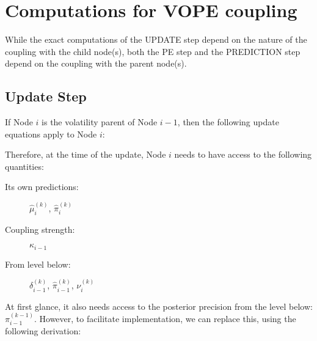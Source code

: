 \section{Computations for VOPE coupling}
While the exact computations of the \textsf{UPDATE step} depend on the nature of the coupling with the child node(s), both the \textsf{PE step} and the \textsf{PREDICTION step} depend on the coupling with the parent node(s).

\subsection{Update Step}
If Node $i$ is the volatility parent of Node $i-1$, then the following update equations apply to Node $i$:
\vspace{0.5cm}

\noindent
{}%
\vspace{0.5cm}

\noindent
Therefore, at the time of the update, Node $i$ needs to have access to the following quantities:

\begin{description}
\item[Its own predictions:]  	$\hat{\mu}_i^{(k)}$, $\hat{\pi}_i^{(k)}$
\item[Coupling strength:] 		$\kappa_{i-1}$
\item[From level below:]		$\delta_{i-1}^{(k)}$, $\hat{\pi}_{i-1}^{(k)}$, 
								$\nu_i^{(k)}$
\end{description}

At first glance, it also needs access to the posterior precision from the level below: $\pi_{i-1}^{(k-1)}$. However, to facilitate implementation, we can replace this, using the following derivation:

